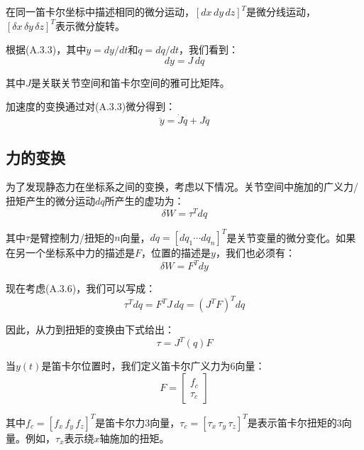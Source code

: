 \documentclass[UTF8,a4paper]{ctexart}
\begin{document}
在同一笛卡尔坐标中描述相同的微分运动，$[dx \, dy \, dz]^T$是微分线运动，$[\delta x \, \delta y \, \delta z]^T$表示微分旋转。

根据(A.3.3)，其中$\dot{y} = dy/dt$和$\dot{q} = dq/dt$，我们看到：
\begin{equation}
dy = J \, dq
\tag{A.3.6}
\end{equation}

其中$J$是关联关节空间和笛卡尔空间的雅可比矩阵。

加速度的变换通过对(A.3.3)微分得到：
\begin{equation}
\ddot{y} = \dot{J}\dot{q} + J\ddot{q}
\tag{A.3.7}
\end{equation}

\subsection{力的变换}

为了发现静态力在坐标系之间的变换，考虑以下情况。关节空间中施加的广义力/扭矩产生的微分运动$dq$所产生的虚功为：
\begin{equation}
\delta W = \tau^T dq
\tag{A.3.8}
\end{equation}

其中$\tau$是臂控制力/扭矩的$n$向量，$dq = [dq_1 \cdots dq_n]^T$是关节变量的微分变化。如果在另一个坐标系中力的描述是$F$，位置的描述是$y$，我们也必须有：
\begin{equation}
\delta W = F^T dy
\tag{A.3.9}
\end{equation}

现在考虑(A.3.6)，我们可以写成：
\begin{equation}
\tau^T dq = F^T J \, dq = (J^T F)^T dq
\end{equation}

因此，从力到扭矩的变换由下式给出：
\begin{equation}
\tau = J^T(q) F
\tag{A.3.10}
\end{equation}

当$y(t)$是笛卡尔位置时，我们定义笛卡尔广义力为6向量：
\begin{equation}
F = \begin{bmatrix} f_c \\ \tau_c \end{bmatrix}
\tag{A.3.11}
\end{equation}

其中$f_c = [f_x \, f_y \, f_z]^T$是笛卡尔力3向量，$\tau_c = [\tau_x \, \tau_y \, \tau_z]^T$是表示笛卡尔扭矩的3向量。例如，$\tau_x$表示绕$x$轴施加的扭矩。
\end{document}
